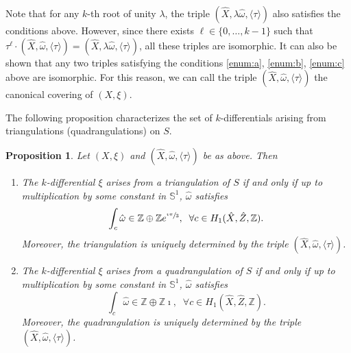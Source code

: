 \documentclass[JEP,XML,SOM,Unicode]{cedram}
\newenvironment{enumeratei}
{\bgroup\def\theenumi{\roman{enumi}}\def\theenumii{\arabic{enumii}}\begin{enumerate}}
{\end{enumerate}\egroup}
\theoremstyle{plain}
\newtheorem{Proposition}[Theorem]{Proposition}
\theoremstyle{definition}
\newcommand\Z{\mathbb{Z}}
\renewcommand{\S}{\mathbb{S}}
\newcommand{\hX}{\hat{X}}
\newcommand{\homg}{\hat{\omega}}
\begin{document}
Note that for any $k$-th root of unity $\lambda$, the triple $(\hX, \lambda\homg,\langle \tau\rangle)$ also satisfies the conditions above. However, since there exists $\ell \in \{0,\dots,k-1\}$ such that $\tau^\ell\cdot(\hX,\homg,\langle \tau\rangle)=(\hX, \lambda\homg,\langle \tau\rangle)$, all these triples are isomorphic. It can also be shown that any two triples satisfying the conditions \eqref{enum:a}, \eqref{enum:b}, \eqref{enum:c} above are isomorphic.
For this reason, we can call the triple $(\hX,\homg,\langle\tau\rangle)$ the canonical covering of $(X,\xi)$.

The following proposition characterizes the set of $k$-differentials arising from triangulations (\resp quadrangulations) on $S$.
\begin{Proposition}\label{prop:reg:tiled:surface}
Let $(X,\xi)$ and $(\hX,\homg,\langle \tau \rangle)$ be as above. Then
\begin{enumeratei}
\item
The $k$-differential $\xi$ arises from a triangulation of $S$ if and only if up to multiplication by some constant in $\S^1$, $\homg$ satisfies
\begin{equation}\label{eq:cond:kdiff:triang}
\int_c\hat{\omega} \in \Z\oplus\Z e^{\sfrac{\imath\pi}{3}}, \; \; \forall c\in H_1(\hat{X},\hat{Z},\Z).
\end{equation}
Moreover, the triangulation is uniquely determined by the triple $(\hat{X},\hat{\omega},\langle\tau\rangle)$.

\item
The $k$-differential $\xi$ arises from a quadrangulation of $S$ if and only if up to multiplication by some constant in $\S^1$, $\homg$ satisfies
\begin{equation}\label{eq:cond:kdiff:quad}
\int_c\hat{\omega} \in \Z\oplus\Z\imath, \; \; \forall c\in H_1(\hat{X},\hat{Z},\Z).
\end{equation}
Moreover, the quadrangulation is uniquely determined by the triple $(\hat{X},\hat{\omega},\langle\tau\rangle)$.
\end{enumeratei}
\end{Proposition}
\end{document}
